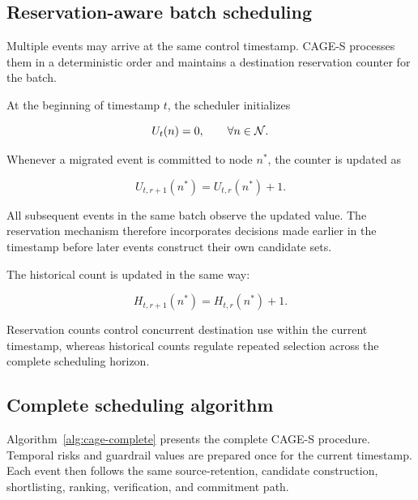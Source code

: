 \subsection{Reservation-aware batch scheduling}

Multiple events may arrive at the same control timestamp. CAGE-S processes
them in a deterministic order and maintains a destination reservation
counter for the batch.

At the beginning of timestamp $t$, the scheduler initializes

\begin{equation}
    U_t(n)=0,
    \qquad
    \forall n\in\mathcal{N}.
\end{equation}

Whenever a migrated event is committed to node $n^{*}$, the counter is
updated as

\begin{equation}
\label{eq:reservation-update-method}
    U_{t,r+1}(n^{*})
    =
    U_{t,r}(n^{*})+1.
\end{equation}

All subsequent events in the same batch observe the updated value. The
reservation mechanism therefore incorporates decisions made earlier in
the timestamp before later events construct their own candidate sets.

The historical count is updated in the same way:

\begin{equation}
\label{eq:history-update-method}
    H_{t,r+1}(n^{*})
    =
    H_{t,r}(n^{*})+1.
\end{equation}

Reservation counts control concurrent destination use within the current
timestamp, whereas historical counts regulate repeated selection across
the complete scheduling horizon.

\subsection{Complete scheduling algorithm}

Algorithm~\ref{alg:cage-complete} presents the complete CAGE-S procedure.
Temporal risks and guardrail values are prepared once for the current
timestamp. Each event then follows the same source-retention, candidate
construction, shortlisting, ranking, verification, and commitment path.

